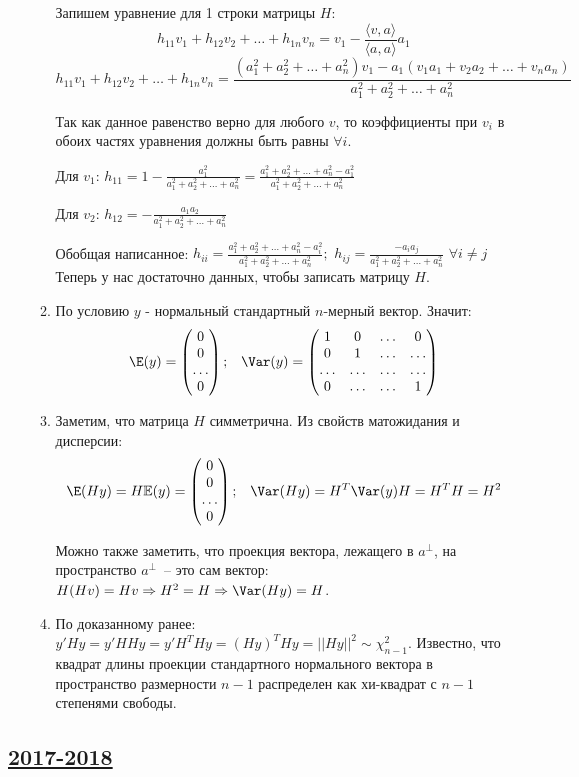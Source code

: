 \begin{enumerate}
\begin{enumerate}
	Запишем уравнение для 1 строки матрицы $H$:
	\[
	h_{11} v_1 + h_{12} v_2 + \ldots + h_{1n} v_n = v_1 - \frac{\langle v,a \rangle}{\langle a,a \rangle} a_1
	\]
	\[
	h_{11} v_1 + h_{12} v_2 + \ldots + h_{1n} v_n = \frac{(a_1^2 + a_2^2 + \ldots + a_n^2)v_1 - a_1(v_1 a_1 + v_2 a_2 + \ldots + v_n a_n)}{a_1^2 + a_2^2 + \ldots + a_n^2}
	\]
	
	Так как данное равенство верно для любого $v$, то коэффициенты при $v_i$ в обоих частях уравнения должны быть равны $\forall i$.
	
	Для $v_1$: $\displaystyle h_{11} = 1 - \frac{a_1^2}{a_1^2 + a_2^2 + \ldots + a_n^2} = \frac{a_1^2 + a_2^2 + \ldots + a_n^2 - a_1^2}{a_1^2 + a_2^2 + \ldots + a_n^2}$
	
	Для $v_2$: $\displaystyle h_{12} = -\frac{a_1a_2}{a_1^2 + a_2^2 + \ldots + a_n^2}$
	
	Обобщая написанное: $\displaystyle h_{ii} = \frac{a_1^2 + a_2^2 + \ldots + a_n^2 - a_i^2}{a_1^2 + a_2^2 + \ldots + a_n^2}; \,\, h_{ij} = \frac{-a_ia_j}{a_1^2 + a_2^2 + \ldots + a_n^2} \,\, \forall i \ne j$
	Теперь у нас достаточно данных, чтобы записать матрицу $H$.
	\item
	По условию $y$ - нормальный стандартный $n$-мерный вектор. Значит:
	\[
	\E(y) =
	\begin{pmatrix}
	0 \\ 0 \\ \ldots \\ 0
	\end{pmatrix};
	\,\,\,\,\,
	\Var(y) =
	\begin{pmatrix}
	1 & 0 & \ldots & 0 \\
	0 & 1 & \ldots & \ldots \\
	\ldots & \ldots & \ldots & \ldots \\
	0 & \ldots & \ldots & 1 \\
	\end{pmatrix}
	\]
	\item
	Заметим, что матрица $H$ симметрична. Из свойств матожидания и дисперсии:
	\[
	\E(Hy) = H \mathbb{E}(y) =
	\begin{pmatrix}
	0 \\ 0 \\ \ldots \\ 0
	\end{pmatrix};
	\,\,\,\,\,
	\Var(Hy) = H^T \Var(y) H = H^T H = H^2
	\]
	
	Можно также заметить, что проекция вектора, лежащего в $a^{\perp}$, на пространство $a^{\perp}$~-- это сам вектор: $H(Hv) = Hv \Rightarrow H^2 = H \Rightarrow \Var(Hy) = H$.
	\item
	По доказанному ранее: $y'Hy = y'HHy = y'H^THy = (Hy)^THy = ||Hy||^2 \sim \chi^2_{n-1}$. Известно, что квадрат длины проекции стандартного нормального вектора в пространство размерности $n-1$ распределен как хи-квадрат с $n-1$ степенями свободы.
\end{enumerate}
\end{enumerate}

\subsection[2017-2018]{\hyperref[sec:kr_04_ip_2017_2018]{2017-2018}}
\label{sec:sol_kr_04_ip_2017_2018}